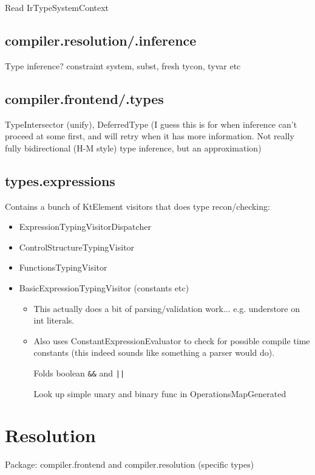 \documentclass{article}
\begin{document}
Read IrTypeSystemContext

\subsection{compiler.resolution/.inference}

Type inference? constraint system, subst, fresh tycon, tyvar etc

\subsection{compiler.frontend/.types}

TypeIntersector (unify), DeferredType (I guess this is for when inference can't proceed at some first, and will retry when it has more information. Not really fully bidirectional (H-M style) type inference, but an approximation)

\subsection{types.expressions}

Contains a bunch of KtElement visitors that does type recon/checking:
\begin{itemize}
\item ExpressionTypingVisitorDispatcher
\item ControlStructureTypingVisitor
\item FunctionsTypingVisitor
\item BasicExpressionTypingVisitor (constants etc)
\begin{itemize}
  \item This actually does a bit of parsing/validation work... e.g. understore on int literals.
  \item Also uses ConstantExpressionEvaluator to check for possible compile time constants (this indeed sounds like something a parser would do).
  
  Folds boolean \texttt{\&\&} and \texttt{||}

  Look up simple unary and binary func in OperationsMapGenerated
\end{itemize}
\end{itemize}

\section{Resolution}
\label{sec:reso}

Package: compiler.frontend and compiler.resolution (specific types)
\end{document}
